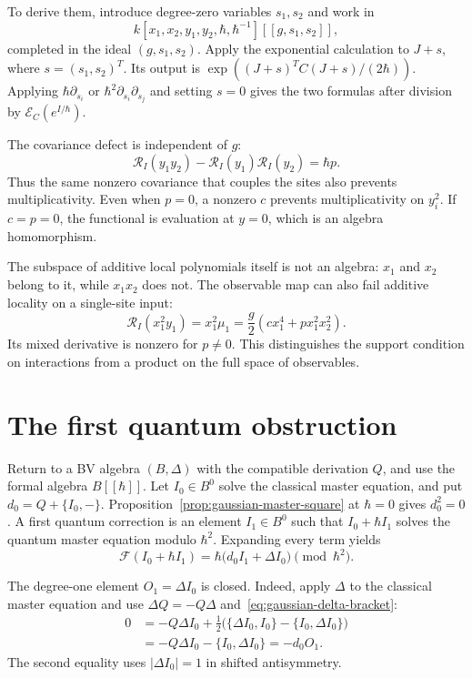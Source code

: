 To derive them, introduce degree-zero variables $s_1,s_2$ and work in
\[
 k[x_1,x_2,y_1,y_2,\hbar,\hbar^{-1}][[g,s_1,s_2]],
\]
completed in the ideal $(g,s_1,s_2)$.
Apply the exponential calculation to $J+s$, where
$s=(s_1,s_2)^T$.
Its output is $\exp((J+s)^TC(J+s)/(2\hbar))$.
Applying $\hbar\partial_{s_i}$ or
$\hbar^2\partial_{s_i}\partial_{s_j}$ and setting $s=0$ gives
the two formulas after division by $\mathcal E_C(e^{I/\hbar})$.

The covariance defect is independent of $g$:
\[
 \mathcal R_I(y_1y_2)-\mathcal R_I(y_1)\mathcal R_I(y_2)=\hbar p.
\]
Thus the same nonzero covariance that couples the sites also prevents
multiplicativity.
Even when $p=0$, a nonzero $c$ prevents multiplicativity on $y_i^2$.
If $c=p=0$, the functional is evaluation at $y=0$, which is an
algebra homomorphism.

The subspace of additive local polynomials itself is not an algebra:
$x_1$ and $x_2$ belong to it, while $x_1x_2$ does not.
The observable map can also fail additive locality on a single-site
input:
\[
 \mathcal R_I(x_1^2y_1)
 =x_1^2\mu_1
 =\frac g2\left(cx_1^4+px_1^2x_2^2\right).
\]
Its mixed derivative is nonzero for $p\ne0$.
This distinguishes the support condition on interactions from a product
on the full space of observables.

\section{The first quantum obstruction}
\label{sec:gaussian-obstruction}

Return to a BV algebra $(B,\Delta)$ with the compatible derivation $Q$,
and use the formal algebra $B[[\hbar]]$.
Let $I_0\in B^0$ solve the classical master equation, and put
$d_0=Q+\{I_0,-\}$.
Proposition~\ref{prop:gaussian-master-square} at $\hbar=0$ gives
$d_0^2=0$.
A first quantum correction is an element $I_1\in B^0$ such that
$I_0+\hbar I_1$ solves the quantum master equation modulo $\hbar^2$.
Expanding every term yields
\begin{equation}\label{eq:gaussian-first-obstruction}
 \mathcal F(I_0+\hbar I_1)
 =\hbar\bigl(d_0I_1+\Delta I_0\bigr)
       \pmod{\hbar^2}.
\end{equation}

The degree-one element $O_1=\Delta I_0$ is closed.
Indeed, apply $\Delta$ to the classical master equation and use
$\Delta Q=-Q\Delta$ and~\eqref{eq:gaussian-delta-bracket}:
\[
 \begin{split}
 0&=-Q\Delta I_0+\tfrac12\bigl(
       \{\Delta I_0,I_0\}-\{I_0,\Delta I_0\}\bigr)\\
  &=-Q\Delta I_0-\{I_0,\Delta I_0\}=-d_0O_1.
 \end{split}
\]
The second equality uses $|\Delta I_0|=1$ in shifted antisymmetry.

